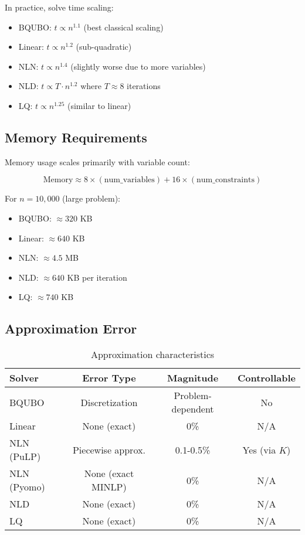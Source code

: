 \documentclass[11pt,a4paper]{article}
\begin{document}
In practice, solve time scaling:
\begin{itemize}
    \item BQUBO: $t \propto n^{1.1}$ (best classical scaling)
    \item Linear: $t \propto n^{1.2}$ (sub-quadratic)
    \item NLN: $t \propto n^{1.4}$ (slightly worse due to more variables)
    \item NLD: $t \propto T \cdot n^{1.2}$ where $T \approx 8$ iterations
    \item LQ: $t \propto n^{1.25}$ (similar to linear)
\end{itemize}

\subsection{Memory Requirements}

Memory usage scales primarily with variable count:

\begin{equation}
\text{Memory} \approx 8 \times (\text{num\_variables}) + 16 \times (\text{num\_constraints})
\end{equation}

For $n = 10,000$ (large problem):
\begin{itemize}
    \item BQUBO: $\approx 320$ KB
    \item Linear: $\approx 640$ KB
    \item NLN: $\approx 4.5$ MB
    \item NLD: $\approx 640$ KB per iteration
    \item LQ: $\approx 740$ KB
\end{itemize}

\subsection{Approximation Error}

\begin{table}[h]
\centering
\caption{Approximation characteristics}
\label{tab:error}
\begin{tabular}{lccc}
\toprule
\textbf{Solver} & \textbf{Error Type} & \textbf{Magnitude} & \textbf{Controllable} \\
\midrule
BQUBO & Discretization & Problem-dependent & No \\
Linear & None (exact) & 0\% & N/A \\
NLN (PuLP) & Piecewise approx. & 0.1-0.5\% & Yes (via $K$) \\
NLN (Pyomo) & None (exact MINLP) & 0\% & N/A \\
NLD & None (exact) & 0\% & N/A \\
LQ & None (exact) & 0\% & N/A \\
\bottomrule
\end{tabular}
\end{table}
\end{document}
